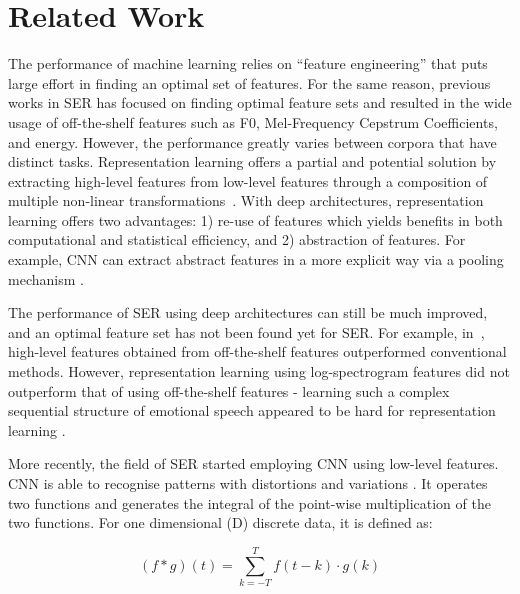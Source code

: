 \documentclass[conference, compsoc, twoside]{IEEEtran}
\begin{document}
\section{Related Work}\label{sec:relatedwork}

The performance of machine learning relies on ``feature engineering'' that puts large effort in finding an optimal set of features. For the same reason, previous works in SER has focused on finding optimal feature sets and resulted in the wide usage of off-the-shelf features such as F0, Mel-Frequency Cepstrum Coefficients, and energy. However, the performance greatly varies between corpora that have distinct tasks. Representation learning offers a partial and potential solution by extracting high-level features from low-level features through a composition of multiple non-linear transformations~\cite{bengio2013representation}. With deep architectures, representation learning offers two advantages: 1) re-use of features which yields benefits in both computational and statistical efficiency, and 2) abstraction of features. For example, CNN can extract abstract features in a more explicit way via a pooling mechanism \cite{lecun1995convolutional}. 

The performance of SER using deep architectures can still be much improved, and an optimal feature set has not been found yet for SER. For example, in~\cite{kunHan2014dnn,lee2015high,kim2017interspeech}, high-level features obtained from off-the-shelf features outperformed conventional methods. However, representation learning using log-spectrogram features did not outperform that of using off-the-shelf features - learning such a complex sequential structure of emotional speech appeared to be hard for representation learning \cite{ghoshrepresentation2016}. 

More recently, the field of SER started employing CNN using low-level features. CNN is able to recognise patterns with distortions and variations \cite{lecun1995convolutional}. It operates two functions and generates the integral of the point-wise multiplication of the two functions. For one dimensional (D) discrete data, it is defined as:

\begin{equation} \label{eq:highway-1}
  (f \ast g)(t) = \displaystyle \sum_{k=-T}^{T} f(t-k) \cdot g(k)
\end{equation}
\end{document}
